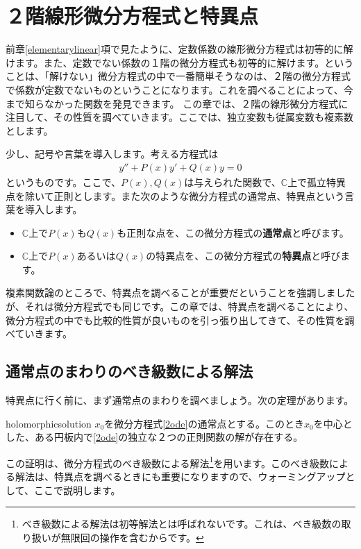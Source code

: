 \documentclass[report,paper=a4, fontsize=12pt, line_length=16cm, number_of_lines=33,dvipdfmx]{jlreq}
\numberwithin{equation}{section}
\newcommand{\Cb}{\mathbb{C}}
\newcommand{\strong}[1]{\textsf{\bfseries #1}}
\begin{document}
\chapter{２階線形微分方程式と特異点}
前章\ref{elementarylinear}項で見たように、定数係数の線形微分方程式は初等的に解けます。また、定数でない係数の１階の微分方程式も初等的に解けます。ということは、「解けない」微分方程式の中で一番簡単そうなのは、２階の微分方程式で係数が定数でないものということになります。これを調べることによって、今まで知らなかった関数を発見できます。
この章では、２階の線形微分方程式に注目して、その性質を調べていきます。ここでは、独立変数も従属変数も複素数とします。

少し、記号や言葉を導入します。考える方程式は
\begin{align}
  y''+P(x)y'+Q(x)y=0\label{2ode}
\end{align}
というものです。ここで、$P(x),Q(x)$は与えられた関数で、$\Cb$上で孤立特異点を除いて正則とします。また次のような微分方程式の通常点、特異点という言葉を導入します。
\begin{itemize}
  \item $\Cb$上で$P(x)$も$Q(x)$も正則な点を、この微分方程式の\strong{通常点}と呼びます。
  \item $\Cb$上で$P(x)$あるいは$Q(x)$の特異点を、この微分方程式の\strong{特異点}と呼びます。
\end{itemize}

複素関数論のところで、特異点を調べることが重要だということを強調しましたが、それは微分方程式でも同じです。この章では、特異点を調べることにより、微分方程式の中でも比較的性質が良いものを引っ張り出してきて、その性質を調べていきます。

\section{通常点のまわりのべき級数による解法}
特異点に行く前に、まず通常点のまわりを調べましょう。次の定理があります。
\begin{theor}{}{holomorphicsolution}
  $x_0$を微分方程式\eqref{2ode}の通常点とする。このとき$x_0$を中心とした、ある円板内で\eqref{2ode}の独立な２つの正則関数の解が存在する。
\end{theor}

この証明は、微分方程式のべき級数による解法\footnote{べき級数による解法は初等解法とは呼ばれないです。これは、べき級数の取り扱いが無限回の操作を含むからです。}を用います。このべき級数による解法は、特異点を調べるときにも重要になりますので、ウォーミングアップとして、ここで説明します。
\end{document}
